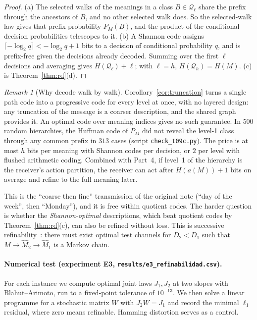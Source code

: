\documentclass[11pt]{article}
\theoremstyle{definition}
\theoremstyle{remark}
\newtheorem{remark}{Remark}
\newcommand{\Q}{\mathcal{Q}}
\begin{document}
\begin{proof}
(a) The selected walks of the meanings in a class $B\in\Q_\ell$ share the prefix through the ancestors of $B$, and no other selected walk does. So the selected-walk law gives that prefix probability $P_M(B)$, and the product of the conditional decision probabilities telescopes to it. (b) A Shannon code assigns $\lceil-\log_2 q\rceil<-\log_2q+1$ bits to a decision of conditional probability $q$, and is prefix-free given the decisions already decoded. Summing over the first $\ell$ decisions and averaging gives $H(\Q_\ell)+\ell$; with $\ell=h$, $H(\Q_h)=H(M)$. (c) is Theorem~\ref{thm:rd}(d).
\end{proof}

\begin{remark}[Why decode walk by walk]
Corollary~\ref{cor:truncation} turns a single path code into a progressive code for every level at once, with no layered design: any truncation of the message is a coarser description, and the shared graph provides it. An optimal code over meaning indices gives no such guarantee. In $500$ random hierarchies, the Huffman code of $P_M$ did not reveal the level-1 class through any common prefix in $313$ cases (script \texttt{check\_t09c.py}). The price is at most $h$ bits per meaning with Shannon codes per decision, or $2$ per level with flushed arithmetic coding. Combined with Part~4, if level~1 of the hierarchy is the receiver's action partition, the receiver can act after $H(a(M))+1$ bits on average and refine to the full meaning later.
\end{remark}

This is the ``coarse then fine'' transmission of the original note (``day of the week'', then ``Monday''), and it is free within quotient codes. The harder question is whether the \emph{Shannon-optimal} descriptions, which beat quotient codes by Theorem~\ref{thm:rd}(c), can also be refined without loss. This is successive refinability~\cite{equitz1991,rimoldi1994}: there must exist optimal test channels for $D_2<D_1$ such that $M\to\hat M_2\to\hat M_1$ is a Markov chain.

\paragraph{Numerical test (experiment E3, \texttt{results/e3\_refinabilidad.csv}).} For each instance we compute optimal joint laws $J_1,J_2$ at two slopes with Blahut--Arimoto, run to a fixed-point tolerance of $10^{-13}$. We then solve a linear programme for a stochastic matrix $W$ with $J_2W=J_1$ and record the minimal $\ell_1$ residual, where zero means refinable. Hamming distortion serves as a control.
\end{document}
